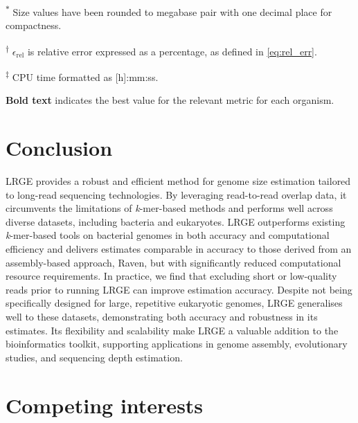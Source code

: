 \documentclass[unnumsec,webpdf,modern,large]{oup-authoring-template}
\theoremstyle{thmstyleone}%
\theoremstyle{thmstyletwo}%
\theoremstyle{thmstylethree}%
\newcommand{\lrge}{LRGE}
\newcommand{\relerr}{$\epsilon_{\text{rel}}$}
\newcommand{\kmer}{\textit{k}-mer}
\begin{document}
\begin{table}[t]
\begin{tabular*}{\textwidth}{@{}lccrlrrrr@{}}
\end{tabular*}
\begin{tablenotes}%
\item \textsuperscript{$\ast$} Size values have been rounded to megabase pair with one decimal place for compactness.
\item \textsuperscript{$\dagger$} \relerr{} is relative error expressed as a percentage, as defined in \autoref{eq:rel_err}.
\item \textsuperscript{$\ddagger$} CPU time formatted as [h]:mm:ss.
\item \textbf{Bold text} indicates the best value for the relevant metric for each organism.
\end{tablenotes}
\end{table}



\section{Conclusion}

\lrge{} provides a robust and efficient method for genome size estimation tailored to long-read sequencing technologies. By leveraging read-to-read overlap data, it circumvents the limitations of \kmer{}-based methods and performs well across diverse datasets, including bacteria and eukaryotes. \lrge{} outperforms existing \kmer{}-based tools on bacterial genomes in both accuracy and computational efficiency and delivers estimates comparable in accuracy to those derived from an assembly-based approach, Raven, but with significantly reduced computational resource requirements. In practice, we find that excluding short or low-quality reads prior to running \lrge{} can improve estimation accuracy. Despite not being specifically designed for large, repetitive eukaryotic genomes, \lrge{} generalises well to these datasets, demonstrating both accuracy and robustness in its estimates. Its flexibility and scalability make \lrge{} a valuable addition to the bioinformatics toolkit, supporting applications in genome assembly, evolutionary studies, and sequencing depth estimation.


\section{Competing interests}
\end{document}

